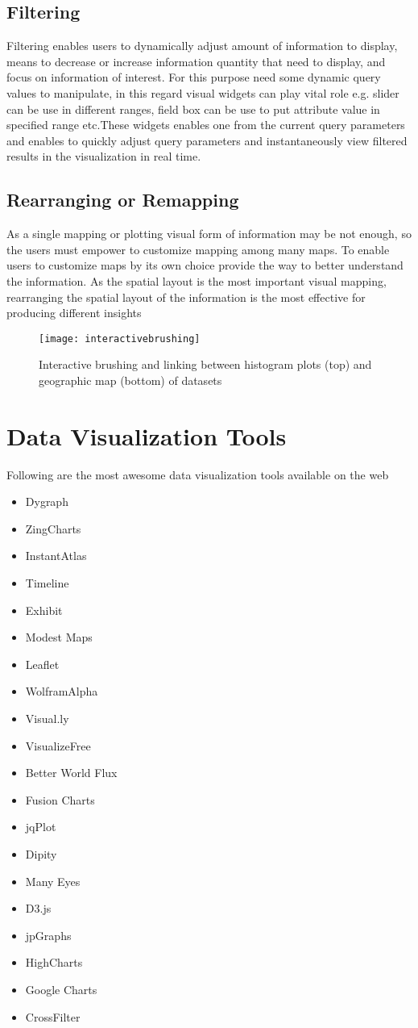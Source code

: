 \subsection{Filtering}
Filtering enables users to dynamically adjust amount of information to display, means to decrease or increase information quantity that need to display, and focus on information of interest. For this purpose need some dynamic query values to manipulate, in this regard visual widgets can play vital role e.g. slider can be use in different ranges, field box can be use to put attribute value in specified range etc.These widgets enables one from the current query parameters and enables to quickly adjust query parameters and instantaneously view filtered results in the visualization in real time.
\subsection{Rearranging or Remapping}
As a single mapping or plotting visual form of information may be not enough, so the users must empower to customize mapping among many maps. To enable users to customize maps by its own choice provide the way to better understand the information. As the spatial layout is the most important visual mapping, rearranging the spatial layout of the information is the most effective for producing different insights
\begin{figure}[h]
	\texttt{[image: interactivebrushing]}
	\centering
	\caption{Interactive brushing and linking between histogram plots (top) and geographic map (bottom) of datasets}
\end{figure}
\section{Data Visualization Tools}
Following are the most awesome data visualization tools available on the web
\begin{multicols}{3}
\begin{itemize}
	\item Dygraph
	\item ZingCharts
	\item InstantAtlas
	\item Timeline
	\item Exhibit
	\item Modest Maps
	\item Leaflet
	\item WolframAlpha
	\item Visual.ly
	\item VisualizeFree
	\item Better World Flux
	\item Fusion Charts
	\item jqPlot
	\item Dipity
	\item Many Eyes
	\item D3.js
	\item jpGraphs
	\item HighCharts
	\item Google Charts
	\item CrossFilter
\end{itemize}
\end{multicols}
